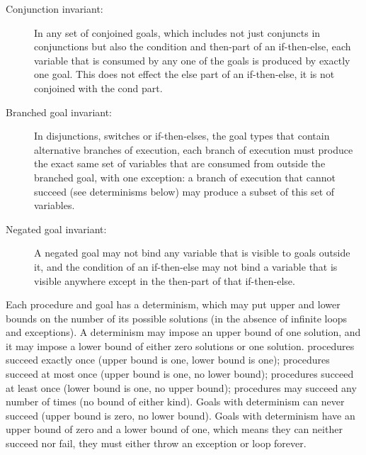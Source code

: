 \begin{description}

  \item[Conjunction invariant:]
  In any set of conjoined goals,
  which includes not just conjuncts in conjunctions
  but also the condition and then-part of an if-then-else,
  each variable that is consumed by any one of the goals
  is produced by exactly one goal.
  This does not effect the else part of an if-then-else, it is not conjoined
  with the cond part.

  \item[Branched goal invariant:]
  In disjunctions, switches or if-then-elses,
  the goal types that contain alternative branches of execution,
  each branch of execution must produce
  the exact same set of variables
  that are consumed from outside the branched goal,
  with one exception:
  a branch of execution that cannot succeed (see determinisms below)
  may produce a subset of this set of variables.
  
  \item[Negated goal invariant:]
  A negated goal may not bind
  any variable that is visible to goals outside it,
  and the condition of an if-then-else may not bind a variable
  that is visible anywhere except in
  the then-part of that if-then-else.

\end{description}

\noindent
Each procedure and goal has a determinism,
which may put upper and lower bounds on the number of its possible solutions
(in the absence of infinite loops and exceptions).
A determinism may impose an upper bound of one solution,
and it may impose a lower bound of either zero solutions or one solution.
\ddet procedures succeed exactly once
(upper bound is one, lower bound is one);
\dsemidet procedures succeed at most once
(upper bound is one, no lower bound);
\dmulti procedures succeed at least once
(lower bound is one, no upper bound);
\dnondet procedures may succeed any number of times
(no bound of either kind).
Goals with determinism \dfailure can never succeed
(upper bound is zero, no lower bound).
Goals with determinism \derroneous
have an upper bound of zero and a lower bound of one,
which means they can neither succeed nor fail,
they must either throw an exception or loop forever.

